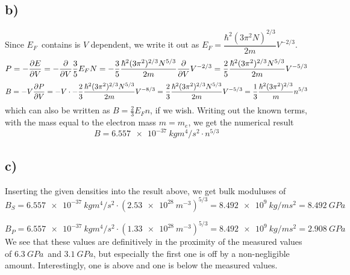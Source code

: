 \documentclass[12p,a4paper]{article}
\begin{document}
\subsection*{b)}
Since $E_F$ contains is $V$ dependent, we write it out as $E_F = \dfrac{\hbar^2(3\pi^2N)^{2/3}}{2m}V^{-2/3}$.
\[
    P = -\pdv{E}{V} = -\pdv{V} \frac{3}{5}E_FN = -\frac{3}{5}\frac{\hbar^2(3\pi^2)^{2/3}N^{5/3}}{2m} \pdv{V}V^{-2/3} = \frac{2}{5}\frac{\hbar^2(3\pi^2)^{2/3}N^{5/3}}{2m} V^{-5/3}
\]
\[
    B = -V\pdv{P}{V} = -V\cdot -\frac{2}{3}\frac{\hbar^2(3\pi^2)^{2/3}N^{5/3}}{2m} V^{-8/3} = \frac{2}{3}\frac{\hbar^2(3\pi^2)^{2/3}N^{5/3}}{2m} V^{-5/3} = \frac{1}{3}\frac{\hbar^2(3\pi^2)^{2/3}}{m} n^{5/3}
\]
which can also be written as $B = \frac{2}{3}E_F n$, if we wish.
Writing out the known terms, with the mass equal to the electron mass $m=m_e$, we get the numerical result
\[
    B = \SI{6.557e-37}{kgm^4/s^2} \cdot n^{5/3}
\]


\subsection*{c)}
Inserting the given densities into the result above, we get bulk moduluses of
\[
    B_S =  \SI{6.557e-37}{kgm^4/s^2} \cdot (\SI{2.53e28}{m^{-3}})^{5/3} = \SI{8.492e9}{kg/ms^2} = \SI{8.492}{GPa}
\]

\[
    B_P =  \SI{6.557e-37}{kgm^4/s^2} \cdot (\SI{1.33e28}{m^{-3}})^{5/3} = \SI{8.492e9}{kg/ms^2} = \SI{2.908}{GPa}
\]
We see that these values are definitively in the proximity of the measured values of $\SI{6.3}{GPa}$ and $\SI{3.1}{GPa}$, but especially the first one is off by a non-negligible amount. Interestingly, one is above and one is below the measured values.
\end{document}
